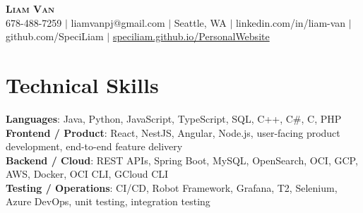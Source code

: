 \documentclass[letterpaper,11pt]{article}
\begin{document}

%
\begin{center}
    \textbf{\Huge \scshape Liam Van} \\ \vspace{1pt}
    \small 678-488-7259 $|$ \small {liamvanpj@gmail.com} $|$ Seattle, WA
 {{$|$ linkedin.com/in/liam-van} {$|$ github.com/SpeciLiam} {$|$ \href{https://speciliam.github.io/PersonalWebsite}{speciliam.github.io/PersonalWebsite}}}

\end{center}

\section{Technical Skills}
 \begin{itemize}[leftmargin=0.15in, label={}]
    \small{\item{
     \textbf{Languages}{: Java, Python, JavaScript, TypeScript, SQL, C++, C\#, C, PHP} \\
     \textbf{Frontend / Product}{: React, NestJS, Angular, Node.js, user-facing product development, end-to-end feature delivery} \\
     \textbf{Backend / Cloud}{: REST APIs, Spring Boot, MySQL, OpenSearch, OCI, GCP, AWS, Docker, OCI CLI, GCloud CLI} \\
     \textbf{Testing / Operations}{: CI/CD, Robot Framework, Grafana, T2, Selenium, Azure DevOps, unit testing, integration testing} \\
    }}
 \end{itemize}
%
\end{document}
